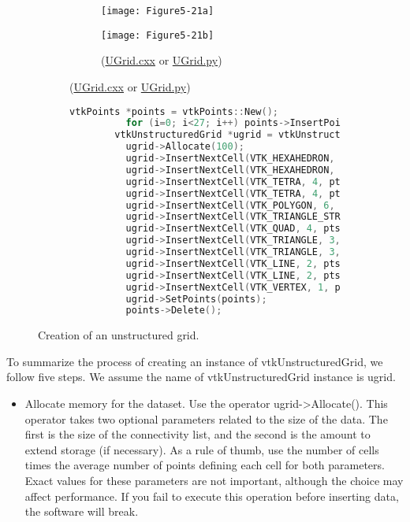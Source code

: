 \begin{description}[leftmargin=0cm,labelindent=0cm]
\begin{figure}[!htb]
    \centering
    \begin{subfigure}[h]{0.96\linewidth}
    	\begin{subfigure}[h]{0.48\linewidth}
    		\texttt{[image: Figure5-21a]}
    		\caption*{}
    		\label{fig:Figure5-21a}
    	\end{subfigure}
    	\hfill
    	\begin{subfigure}[h]{0.48\linewidth}
    		\texttt{[image: Figure5-21b]}
    		\caption*{(\href{https://lorensen.github.io/VTKExamples/site/Cxx/UnstructuredGrid/UGrid/}{UGrid.cxx} or \href{https://lorensen.github.io/VTKExamples/site/Python/UnstructuredGrid/UGrid/}{UGrid.py})}
    		\label{fig:Figure5-21b}
    	\end{subfigure}
	\end{subfigure}
	\hfill
	\begin{subfigure}[h]{0.76\linewidth}
		\begin{lstlisting}[language=C++, caption={}]
		vtkPoints *points = vtkPoints::New();
		  for (i=0; i<27; i++) points->InsertPoint(i,x[i]);
		vtkUnstructuredGrid *ugrid = vtkUnstructuredGrid::New();
		  ugrid->Allocate(100);
		  ugrid->InsertNextCell(VTK_HEXAHEDRON, 8, pts[0]);
		  ugrid->InsertNextCell(VTK_HEXAHEDRON, 8, pts[1]);
		  ugrid->InsertNextCell(VTK_TETRA, 4, pts[2]);
		  ugrid->InsertNextCell(VTK_TETRA, 4, pts[3]);
		  ugrid->InsertNextCell(VTK_POLYGON, 6, pts[4]);
		  ugrid->InsertNextCell(VTK_TRIANGLE_STRIP, 6, pts[5]);
		  ugrid->InsertNextCell(VTK_QUAD, 4, pts[6]);
		  ugrid->InsertNextCell(VTK_TRIANGLE, 3, pts[7]);
		  ugrid->InsertNextCell(VTK_TRIANGLE, 3, pts[8]);
		  ugrid->InsertNextCell(VTK_LINE, 2, pts[9]);
		  ugrid->InsertNextCell(VTK_LINE, 2, pts[10]);
		  ugrid->InsertNextCell(VTK_VERTEX, 1, pts[11]);
		  ugrid->SetPoints(points);
		  points->Delete();
		\end{lstlisting}
		\caption*{}
		\label{fig:Figure5-21c}
	\end{subfigure}
	\caption{Creation of an unstructured grid.}\label{fig:Figure5-21}
\end{figure}

To summarize the process of creating an instance of vtkUnstructuredGrid, we follow five steps. We assume the name of vtkUnstructuredGrid instance is ugrid.

\begin{itemize}

	\item Allocate memory for the dataset. Use the operator ugrid->Allocate(). This operator takes two optional parameters related to the size of the data. The first is the size of the connectivity list, and the second is the amount to extend storage (if necessary). As a rule of thumb, use the number of cells times the average number of points defining each cell for both parameters. Exact values for these parameters are not important, although the choice may affect performance. If you fail to execute this operation before inserting data, the software will break.


\end{itemize}
\end{description}
